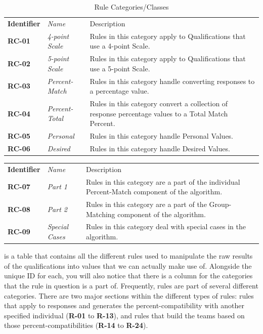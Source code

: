 \documentclass[12pt,letterpaper]{article}
\begin{document}
\begin{table}[H]
	\caption{Rule Categories/Classes}
	\begin{tabu} to 
	    \tableheader{}Identifier & Name & Description\\
		RC-01 & 4-point Scale & Rules in this category apply to Qualifications that use a 4-point Scale.\\
		RC-02 & 5-point Scale & Rules in this category apply to Qualifications that use a 5-point Scale.\\
		RC-03 & Percent-Match & Rules in this category handle converting responses to a percentage value.\\
		RC-04 & Percent-Total & Rules in this category convert a collection of response percentage values to a Total Match Percent.\\
		RC-05 & Personal & Rules in this category handle Personal Values. \\
		RC-06 & Desired & Rules in this category handle Desired Values.\\
	\end{tabu}
\end{table}

\begin{center}
\begin{tabu} to 
	    \tableheader{}Identifier & Name & Description\\
		RC-07 & Part 1 & Rules in this category are a part of the individual Percent-Match component of the algorithm.\\
		RC-08 & Part 2 & Rules in this category are a part of the Group-Matching component of the algorithm.\\
		RC-09 & Special Cases & Rules in this category deal with special cases in the algorithm.\\
\end{tabu}
\end{center}

 is a table that contains all the different rules used to manipulate the raw results of the qualifications into values that we can actually make use of. Alongside the unique ID for each, you will also notice that there is a column for the categories that the rule in question is a part of. Frequently, rules are part of several different categories. There are two major sections within the different types of rules: rules that apply to responses and generates the percent-compatibility with another specified individual ({\bf R-01} to {\bf R-13}), and rules that build the teams based on those percent-compatibilities ({\bf R-14} to {\bf R-24}).
\end{document}
